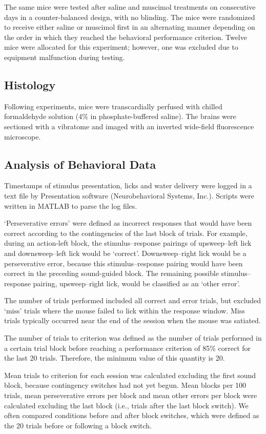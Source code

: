 The same mice were tested after saline and muscimol treatments on consecutive days in a counter-balanced design, with no blinding. The mice were randomized to receive either saline or muscimol first in an alternating manner depending on the order in which they reached the behavioral performance criterion. Twelve mice were allocated for this experiment; however, one was excluded due to equipment malfunction during testing.

\subsection*{Histology}
Following experiments, mice were transcardially perfused with chilled formaldehyde solution (4\% in phosphate-buffered saline). The brains were sectioned with a vibratome and imaged with an inverted wide-field fluorescence microscope.

\subsection*{Analysis of Behavioral Data}
Timestamps of stimulus presentation, licks and water delivery were logged in a text file by Presentation software (Neurobehavioral Systems, Inc.). Scripts were written in MATLAB to parse the log files. 

`Perseverative errors' were defined as incorrect responses that would have been correct according to the contingencies of the last block of trials. For example, during an action-left block, the stimulus–response pairings of upsweep–left lick and downsweep–left lick would be `correct'. Downsweep–right lick would be a perseverative error, because this stimulus–response pairing would have been correct in the preceding sound-guided block. The remaining possible stimulus–response pairing, upsweep–right lick, would be classified as an `other error'. 

The number of trials performed included all correct and error trials, but excluded `miss' trials where the mouse failed to lick within the response window. Miss trials typically occurred near the end of the session when the mouse was satiated. 

The number of trials to criterion was defined as the number of trials performed in a certain trial block before reaching a performance criterion of 85\% correct for the last 20 trials. Therefore, the minimum value of this quantity is 20. 

Mean trials to criterion for each session was calculated excluding the first sound block, because contingency switches had not yet begun. Mean blocks per 100 trials, mean perseverative errors per block and mean other errors per block were calculated excluding the last block (i.e., trials after the last block switch). We often compared conditions before and after block switches, which were defined as the 20 trials before or following a block switch. 

